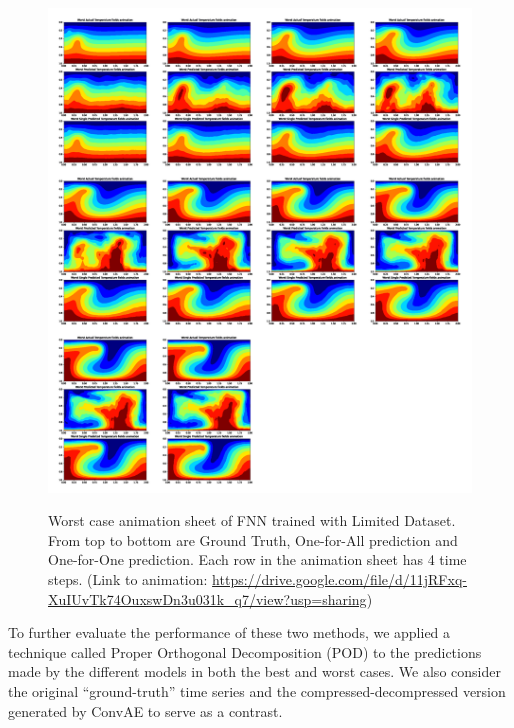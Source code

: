 \begin{figure}[H]
    \centering
    \caption{Worst case animation sheet of FNN trained with Limited Dataset. From top to bottom are Ground Truth, One-for-All prediction and One-for-One prediction. Each row in the animation sheet has 4 time steps. (Link to animation: 
    \url{https://drive.google.com/file/d/11jRFxq-XuIUvTk74OuxswDn3u031k_q7/view?usp=sharing})}
    \includegraphics[scale=0.23]{figures/mantle_convection_images/limited_dataset/FNN_Worst_GIF_sheet.png}
    \label{figure:FNN_limited_worst_gif}
\end{figure}

To further evaluate the performance of these two methods, we applied a technique called Proper Orthogonal Decomposition (POD) to the predictions made by the different models in both the best and worst cases. We also consider the original ``ground-truth'' time series and the compressed-decompressed version generated by ConvAE to serve as a contrast.

